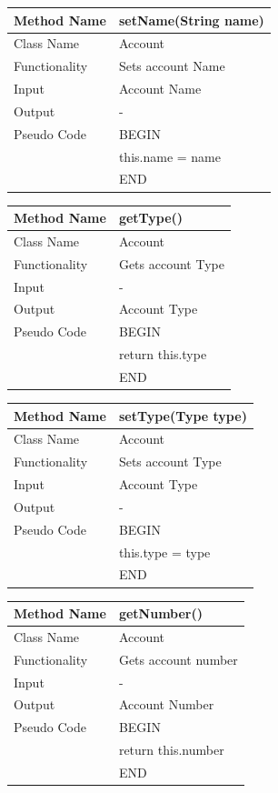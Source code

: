 \documentclass[12pt]{article}
\begin{document}
\begin{tabular}{ |p{3cm}||p{\colWidth}|  }
	\hline
	Method Name &  setName(String name)\\
	\hline
	Class Name & Account\\
	\hline
	Functionality & Sets account Name\\
	\hline
	Input & Account Name\\
	\hline
	Output & -\\
	\hline
	Pseudo Code&BEGIN\\ & this.name = name\\&END\\
	\hline
\end{tabular}  

\begin{tabular}{ |p{3cm}||p{\colWidth}|  }
	\hline
	Method Name &  getType()\\
	\hline
	Class Name & Account\\
	\hline
	Functionality & Gets account Type\\
	\hline
	Input & -\\
	\hline
	Output & Account Type\\
	\hline
	Pseudo Code &BEGIN\\& return this.type\\&END\\
	\hline
\end{tabular}  

\begin{tabular}{ |p{3cm}||p{\colWidth}|  }
	\hline
	Method Name &  setType(Type type)\\
	\hline
	Class Name & Account\\
	\hline
	Functionality & Sets account Type\\
	\hline
	Input & Account Type\\
	\hline
	Output & -\\
	\hline
	Pseudo Code&BEGIN\\ & this.type = type\\&END\\
	\hline
\end{tabular}  

\begin{tabular}{ |p{3cm}||p{\colWidth}|  }
	\hline
	Method Name &  getNumber()\\
	\hline
	Class Name & Account\\
	\hline
	Functionality & Gets account number\\
	\hline
	Input & -\\
	\hline
	Output & Account Number\\
	\hline
	Pseudo Code &BEGIN\\& return this.number\\&END\\
	\hline
\end{tabular}  
\end{document}
